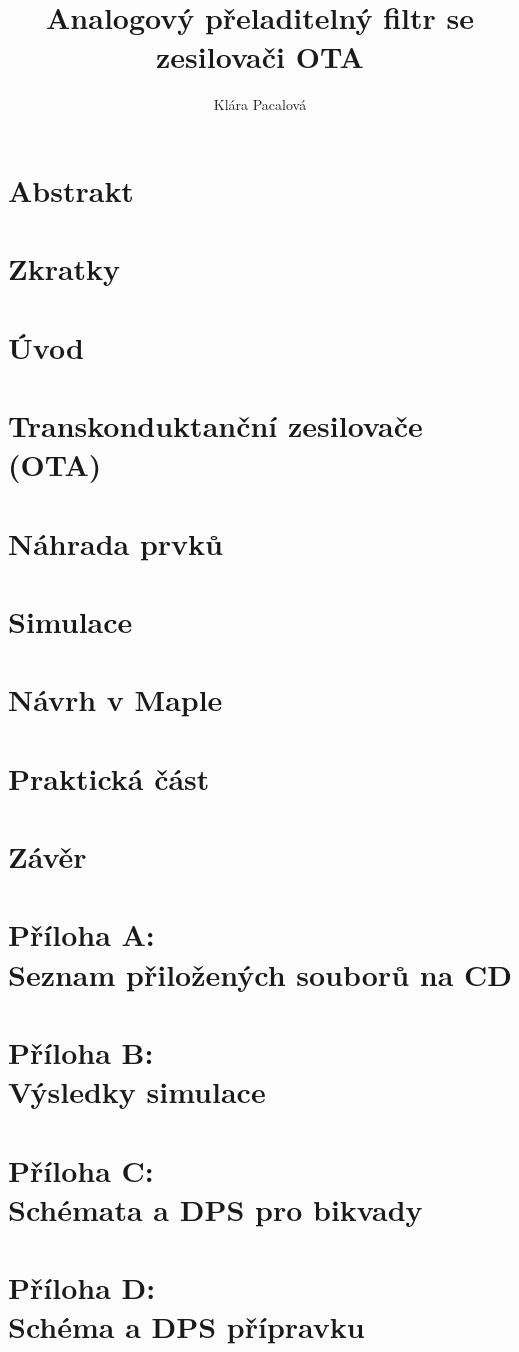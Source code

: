 \documentclass[twoside]{article}
\newcommand{\sekce}[1]{\clearpage \section{#1}}
\newcommand{\nadpis}[1]{\newpage \section*{#1}}
\begin{document}
\title{Analogový přeladitelný filtr se zesilovači OTA}
\author{Klára Pacalová}


\fancyhf[HC]{\bfseries\leftmark}


\thispagestyle{empty} 
\nadpis{}

\thispagestyle{empty} 
\nadpis{}

\thispagestyle{empty} 
\nadpis{Abstrakt}

\renewcommand{\headrulewidth}{0.5pt}

\nadpis{Zkratky}


{
\hypersetup{hidelinks}
\newpage
\tableofcontents
\newpage
\listoffigures
\newpage
\listoftables
}

\clearpage
\setcounter{page}{1}
\sekce{Úvod}

\sekce{Transkonduktanční zesilovače (OTA)}
\label{s:OTA}
\sekce{Náhrada prvků}\label{s:NAH}

\sekce{Simulace}

\sekce{Návrh v Maple}\label{s:MAPLE}

\sekce{Praktická část}\label{s:PRAK}

\sekce{Závěr}


\renewcommand{\headrulewidth}{0pt}
\fancyhf{}
\newpage
\section*{Příloha A: \\Seznam přiložených souborů na CD}

\clearpage
\section*{Příloha B: \\Výsledky simulace} 

\clearpage
\section*{Příloha C: \\Schémata a DPS pro bikvady} 

\clearpage
\section*{Příloha D: \\Schéma a DPS přípravku} 

\end{document}
